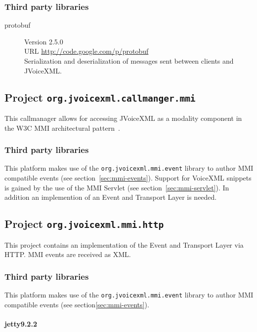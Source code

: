 \documentclass[11pt,a4paper]{article}
\begin{document}
\subsubsection{Third party libraries}
\label{sec:text-third-party-libr}

\begin{description}
\item[protobuf] Version 2.5.0 \\
URL \url{http://code.google.com/p/protobuf} \\
Serialization and deserialization of messages sent between clients and
JVoiceXML.
\end{description}

\subsection{Project \texttt{org.jvoicexml.callmanger.mmi}}

This callmanager allows for accessing JVoiceXML as a modality component in
the W3C MMI architectural pattern~\cite{w3c:2012:mmi_arch}.

\subsubsection{Third party libraries}

This platform makes use of the \lstinline{org.jvoicexml.mmi.event} library
to author MMI compatible events (see section~\ref{sec:mmi-events}).
Support for VoiceXML snippets is gained by the use of the MMI Servlet
(see section~\ref{sec:mmi-servlet}).
In addition an implemention of an Event and Transport Layer is needed.

\subsection{Project \texttt{org.jvoicexml.mmi.http}}

This project contains an implementation of the Event and Transport Layer
via HTTP. MMI events are received as XML.

\subsubsection{Third party libraries}

This platform makes use of the \lstinline{org.jvoicexml.mmi.event} library
to author MMI compatible events (see section\ref{sec:mmi-events}).

\paragraph{jetty9.2.2}
\end{document}
